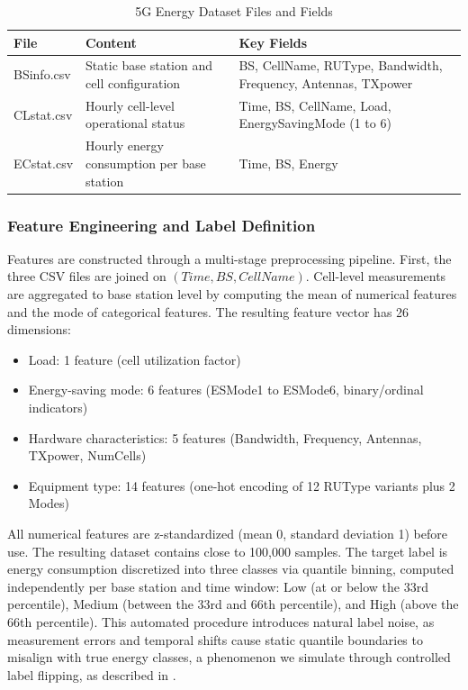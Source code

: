 \begin{table}[h]
\centering
\caption{5G Energy Dataset Files and Fields}
\label{tab:data_files}
\begin{tabular}{|l|p{3cm}|p{5cm}|}
\hline
\textbf{File} & \textbf{Content} & \textbf{Key Fields} \\
\hline
BSinfo.csv & Static base station and cell configuration & BS, CellName, RUType, Bandwidth, Frequency, Antennas, TXpower \\
\hline
CLstat.csv & Hourly cell-level operational status & Time, BS, CellName, Load, EnergySavingMode (1 to 6) \\
\hline
ECstat.csv & Hourly energy consumption per base station & Time, BS, Energy \\
\hline
\end{tabular}
\end{table}


\subsubsection{Feature Engineering and Label Definition}
\label{sec:features_labels}

Features are constructed through a multi-stage preprocessing pipeline. First, the three CSV files are joined on $(Time, BS, CellName)$. Cell-level measurements are aggregated to base station level by computing the mean of numerical features and the mode of categorical features. The resulting feature vector has 26 dimensions:

\begin{itemize}
    \item Load: 1 feature (cell utilization factor)
    \item Energy-saving mode: 6 features (ESMode1 to ESMode6, binary/ordinal indicators)
    \item Hardware characteristics: 5 features (Bandwidth, Frequency, Antennas, TXpower, NumCells)
    \item Equipment type: 14 features (one-hot encoding of 12 RUType variants plus 2 Modes)
\end{itemize}

All numerical features are z-standardized (mean 0, standard deviation 1) before use. The resulting dataset contains close to 100,000 samples. The target label is energy consumption discretized into three classes via quantile binning, computed independently per base station and time window: Low (at or below the 33rd percentile), Medium (between the 33rd and 66th percentile), and High (above the 66th percentile). This automated procedure introduces natural label noise, as measurement errors and temporal shifts cause static quantile boundaries to misalign with true energy classes, a phenomenon we simulate through controlled label flipping, as described in .

